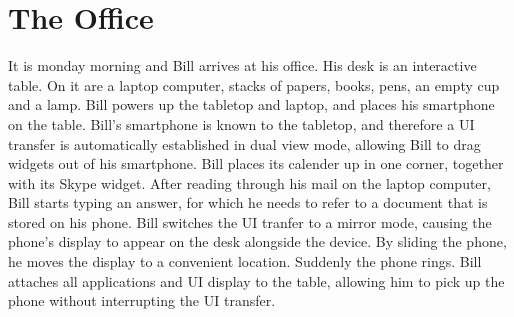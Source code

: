 \documentclass[11pt]{amsart}
\begin{document}
\section{The Office}

It is monday morning and Bill arrives at his office.
His desk is an interactive table.
On it are a laptop computer, stacks of papers, books, pens, an empty cup and a lamp.
Bill powers up the tabletop and laptop, and places his smartphone on the table.
Bill's smartphone is known to the tabletop, and therefore a UI transfer is automatically established in dual view mode, allowing Bill to drag widgets out of his smartphone.
Bill places its calender up in one corner, together with its Skype widget.
After reading through his mail on the laptop computer, Bill starts typing an answer, for which he needs to refer to a document that is stored on his phone.
Bill switches the UI tranfer to a mirror mode, causing the phone's display to appear on the desk alongside the device.
By sliding the phone, he moves the display to a convenient location.
Suddenly the phone rings.
Bill attaches all applications and UI display to the table, allowing him to pick up the phone without interrupting the UI transfer.
\end{document}
